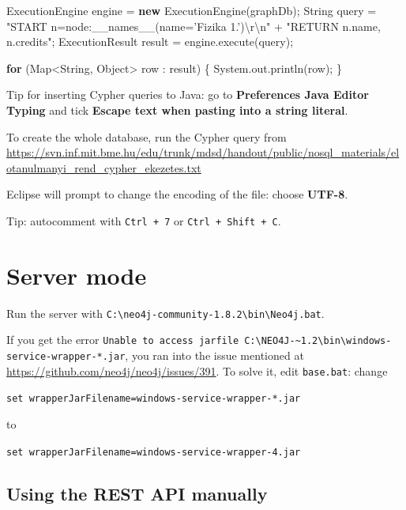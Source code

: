 \documentclass[]{report}
\newenvironment{Shaded}{}{}
\newcommand{\KeywordTok}[1]{\textcolor[rgb]{0.00,0.44,0.13}{\textbf{{#1}}}}
\newcommand{\CharTok}[1]{\textcolor[rgb]{0.25,0.44,0.63}{{#1}}}
\newcommand{\StringTok}[1]{\textcolor[rgb]{0.25,0.44,0.63}{{#1}}}
\newcommand{\FunctionTok}[1]{\textcolor[rgb]{0.02,0.16,0.49}{{#1}}}
\newcommand{\NormalTok}[1]{{#1}}
\begin{document}
\begin{Shaded}
\begin{Highlighting}[]
        \NormalTok{ExecutionEngine engine = }\KeywordTok{new} \FunctionTok{ExecutionEngine}\NormalTok{(graphDb);}
        \NormalTok{String query = }\StringTok{"START n=node:__names__(name='Fizika 1.')}\CharTok{\textbackslash{}r\textbackslash{}n}\StringTok{"}
                \NormalTok{+ }\StringTok{"RETURN n.name, n.credits"}\NormalTok{;}
        \NormalTok{ExecutionResult result = engine.}\FunctionTok{execute}\NormalTok{(query);}
        
        \KeywordTok{for} \NormalTok{(Map<String, Object> row : result) \{}
            \NormalTok{System.}\FunctionTok{out}\NormalTok{.}\FunctionTok{println}\NormalTok{(row);}
        \NormalTok{\}}
\end{Highlighting}
\end{Shaded}

Tip for inserting Cypher queries to Java: go to \textbf{Preferences
\textbar{} Java \textbar{} Editor \textbar{} Typing} and tick
\textbf{Escape text when pasting into a string literal}.

To create the whole database, run the Cypher query from
\url{https://svn.inf.mit.bme.hu/edu/trunk/mdsd/handout/public/nosql_materials/elotanulmanyi_rend_cypher_ekezetes.txt}

Eclipse will prompt to change the encoding of the file: choose
\textbf{UTF-8}.

Tip: autocomment with \texttt{Ctrl + 7} or \texttt{Ctrl + Shift + C}.

\section{Server mode}

Run the server with
\texttt{C:\textbackslash{}neo4j-community-1.8.2\textbackslash{}bin\textbackslash{}Neo4j.bat}.

If you get the error
\texttt{Unable to access jarfile C:\textbackslash{}NEO4J-\textasciitilde{}1.2\textbackslash{}bin\textbackslash{}windows-service-wrapper-*.jar},
you ran into the issue mentioned at
\url{https://github.com/neo4j/neo4j/issues/391}. To solve it, edit
\texttt{base.bat}: change

\texttt{set wrapperJarFilename=windows-service-wrapper-*.jar}

to

\texttt{set wrapperJarFilename=windows-service-wrapper-4.jar}

\subsection{Using the REST API manually}
\end{document}
